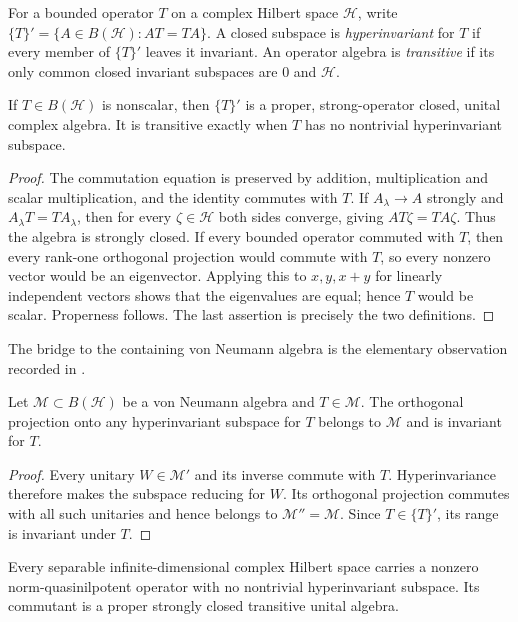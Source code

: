 For a bounded operator $T$ on a complex Hilbert space $\mathcal H$, write
$\{T\}'=\{A\in B(\mathcal H):AT=TA\}$.  A closed subspace is
\emph{hyperinvariant} for $T$ if every member of $\{T\}'$ leaves it
invariant.  An operator algebra is \emph{transitive} if its only common
closed invariant subspaces are $0$ and $\mathcal H$.

\begin{lemma}\label{lem:commutant-algebra}
If $T\in B(\mathcal H)$ is nonscalar, then $\{T\}'$ is a proper,
strong-operator closed, unital complex algebra.  It is transitive exactly
when $T$ has no nontrivial hyperinvariant subspace.
\end{lemma}

\begin{proof}
The commutation equation is preserved by addition, multiplication and
scalar multiplication, and the identity commutes with $T$.  If
$A_\lambda\to A$ strongly and $A_\lambda T=TA_\lambda$, then for every
$\zeta\in\mathcal H$ both sides converge, giving $AT\zeta=TA\zeta$.
Thus the algebra is strongly closed.  If every bounded operator commuted
with $T$, then every rank-one orthogonal projection would commute with
$T$, so every nonzero vector would be an eigenvector.  Applying this to
$x,y,x+y$ for linearly independent vectors shows that the eigenvalues
are equal; hence $T$ would be scalar.  Properness follows.  The last
assertion is precisely the two definitions.
\end{proof}

The bridge to the containing von Neumann algebra is the elementary
observation recorded in \citet[Proposition~2.1]{dykema2005}.

\begin{lemma}\label{lem:hyperinvariant-projection}
Let $\mathcal M\subset B(\mathcal H)$ be a von Neumann algebra and
$T\in\mathcal M$.  The orthogonal projection onto any hyperinvariant
subspace for $T$ belongs to $\mathcal M$ and is invariant for $T$.
\end{lemma}

\begin{proof}
Every unitary $W\in\mathcal M'$ and its inverse commute with $T$.
Hyperinvariance therefore makes the subspace reducing for $W$.  Its
orthogonal projection commutes with all such unitaries and hence belongs
to $\mathcal M''=\mathcal M$.  Since $T\in\{T\}'$, its range is
invariant under $T$.
\end{proof}

\begin{corollary}\label{cor:transitive-commutant}
Every separable infinite-dimensional complex Hilbert space carries a
nonzero norm-quasinilpotent operator with no nontrivial hyperinvariant
subspace.  Its commutant is a proper strongly closed transitive unital
algebra.
\end{corollary}

